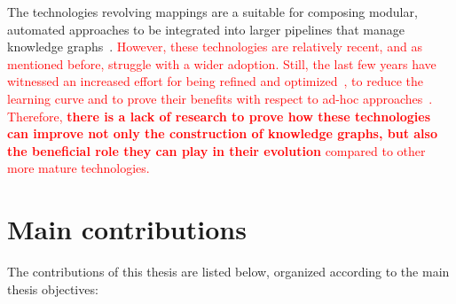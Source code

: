 The technologies revolving mappings are a suitable for composing modular, automated approaches to be integrated into larger pipelines that manage knowledge graphs~\parencite{simsek2021knowledge,cimmino2022helio,grassi2023composable}. \textcolor{red}{However, these technologies are relatively recent, and as mentioned before, struggle with a wider adoption. Still, the last few years have witnessed an increased effort for being refined and optimized~\parencite{calvanese2017ontop,chaves2019parameters,arenas2022morphkgc,iglesias2023scaling}, to reduce the learning curve and to prove their benefits with respect to ad-hoc approaches~\parencite{iglesias2019bio2rdf}. Therefore, \textbf{ there is a lack of research to prove how these technologies can improve not only the construction of knowledge graphs, but also the beneficial role they can play in their evolution} compared to other more mature technologies.}  


\section{Main contributions}

The contributions of this thesis are listed below, organized according to the main thesis objectives:

